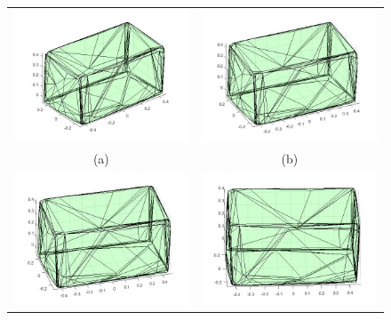 \begin{figure}[ht!]
     \centering
     \begin{tabular}{cc}
        \includegraphics[width=.50\textwidth]{images/1.jpg}&
        \includegraphics[width=.50\textwidth]{images/2.jpg}\\
        (a)&(b)\\
        \includegraphics[width=.50\textwidth]{images/3.jpg}&
        \includegraphics[width=.50\textwidth]{images/4.jpg}\\

\end{tabular}
\end{figure}
